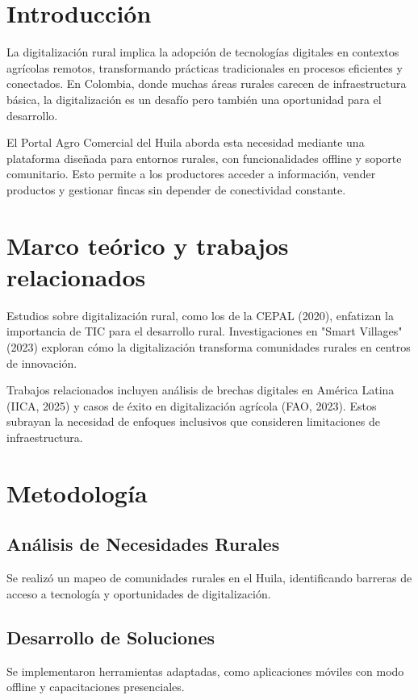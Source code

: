 \section{Introducción}

La digitalización rural implica la adopción de tecnologías digitales en contextos agrícolas remotos, transformando prácticas tradicionales en procesos eficientes y conectados. En Colombia, donde muchas áreas rurales carecen de infraestructura básica, la digitalización es un desafío pero también una oportunidad para el desarrollo.

El Portal Agro Comercial del Huila aborda esta necesidad mediante una plataforma diseñada para entornos rurales, con funcionalidades offline y soporte comunitario. Esto permite a los productores acceder a información, vender productos y gestionar fincas sin depender de conectividad constante.

\section{Marco teórico y trabajos relacionados}

Estudios sobre digitalización rural, como los de la CEPAL (2020), enfatizan la importancia de TIC para el desarrollo rural. Investigaciones en "Smart Villages" (2023) exploran cómo la digitalización transforma comunidades rurales en centros de innovación.

Trabajos relacionados incluyen análisis de brechas digitales en América Latina (IICA, 2025) y casos de éxito en digitalización agrícola (FAO, 2023). Estos subrayan la necesidad de enfoques inclusivos que consideren limitaciones de infraestructura.

\section{Metodología}

\subsection{Análisis de Necesidades Rurales}
Se realizó un mapeo de comunidades rurales en el Huila, identificando barreras de acceso a tecnología y oportunidades de digitalización.

\subsection{Desarrollo de Soluciones}
Se implementaron herramientas adaptadas, como aplicaciones móviles con modo offline y capacitaciones presenciales.

